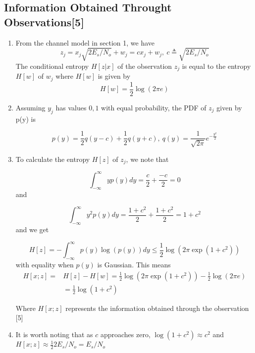 \documentclass[fontsize=12pt]{article}
\theoremstyle{definition}
\begin{document}
\subsection{Information Obtained Throught Observations[5]}
\begin{enumerate}
\item From the channel model in section 1, we have $$z_j = x_j \sqrt{2E_s/N_o} + w_j = cx_j + w_j,~c\triangleq \sqrt{2E_s/N_o}$$ The conditional entropy $H[z|x]$ of the observation $z_j$ is equal to the entropy $H[w]$ of $w_j$ where $H[w]$ is given by 
\begin{equation}
H[w] =\frac{1}{2} \log(2\pi e)
\end{equation}

\item Assuming $y_j$ has values $0,1$ with equal probability, the PDF of $z_j$ given by p(y) is

\begin{equation}
p(y) = \frac{1}{2}q(y-c) + \frac{1}{2} q(y+c),~q(y) = \frac{1}{\sqrt{2\pi} }e^{-\frac{y^2}{2}}
\end{equation}
 
\item To calculate the entropy $H[z]$ of $z_j$, we note that 

$$ \int_{-\infty}^{\infty} yp(y) dy = \frac{c}{2} + \frac{-c}{2} =0$$ and 

$$ \int_{-\infty}^{\infty} y^2p(y) dy = \frac{1+c^2}{2} + \frac{1+c^2}{2} =1+c^2$$
and we get

\begin{equation}
H[z] = -\int_{-\infty}^{\infty} p(y)\log(p(y)) dy \leq \frac{1}{2} \log(2\pi \exp(1+c^2))
\end{equation}
with equality when $p(y)$ is Gaussian. This means
\begin{equation}
\begin{split}
H[x;z] =& H[z]-H[w] =  \frac{1}{2} \log(2\pi \exp(1+c^2)) -  \frac{1}{2} \log(2\pi e)\\
&= \frac{1}{2} \log(1+c^2)
\end{split}
\end{equation}

Where $H[x;z]$ represents the information obtained through  the observation [5]

\item It is worth noting that as $c$ approaches zero, $\log(1+c^2)\approx c^2$ and $H[x;z]\approx \frac{1}{2}2E_s/N_o = E_s/N_o$
\end{enumerate}
\end{document}
